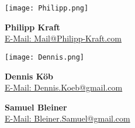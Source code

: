 \begin{figure}[htbp]
  \centering
  \begin{minipage}[t]{0.35\linewidth}
      \centering
      \texttt{[image: Philipp.png]}
      \caption*{\textbf{Philipp Kraft}\\ \href{mailto:mail@philipp-kraft.com}{E-Mail: Mail@Philipp-Kraft.com}}
  \end{minipage}
  \hfill
  \begin{minipage}[t]{0.35\linewidth}
      \centering
      \texttt{[image: Dennis.png]}
      \caption*{\textbf{Dennis Köb}\\ \href{mailto:dennis.koeb@gmail.com}{E-Mail: Dennis.Koeb@gmail.com}}
  \end{minipage}
\end{figure}

\begin{figure}[H]
  \centering
  \caption*{\textbf{Samuel Bleiner}\\ \href{mailto:bleiner.samuel@gmail.com}{E-Mail: Bleiner.Samuel@gmail.com}}
\end{figure}